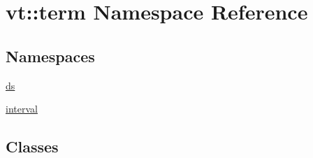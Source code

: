 \hypertarget{namespacevt_1_1term}{}\section{vt\+:\+:term Namespace Reference}
\label{namespacevt_1_1term}
\subsection*{Namespaces}
\begin{DoxyCompactItemize}
\item 
 \hyperlink{namespacevt_1_1term_1_1ds}{ds}
\item 
 \hyperlink{namespacevt_1_1term_1_1interval}{interval}
\end{DoxyCompactItemize}
\subsection*{Classes}
